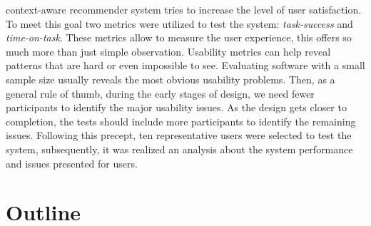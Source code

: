 context-aware recommender system tries to increase the level of user
satisfaction.
To meet this goal two metrics were utilized to test the system:
\textit{task-success} and \textit{time-on-task}. These metrics allow
to measure the user experience, this offers so much more than just
simple observation. Usability metrics can help reveal patterns that
are hard or even impossible to see. Evaluating software with a small
sample size usually reveals the most obvious usability
problems\cite{albert2013measuring}.
Then, as a general rule of thumb, during the early stages of design,
we need fewer participants to identify the major usability issues. As
the design gets closer to completion, the tests should include more
participants to identify the remaining issues. Following this precept,
ten representative users were selected to test the system,
subsequently, it was realized an analysis about the system performance
and issues presented for users.\\
%
%
\section{Outline}

